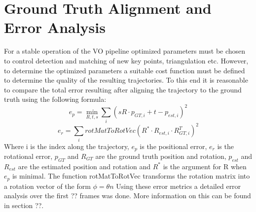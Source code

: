 \section{Ground Truth Alignment and Error Analysis}
\label{simulation}
For a stable operation of the VO pipeline optimized parameters must be chosen to control detection and matching of new key points, triangulation etc. However, to determine the optimized parameters a suitable cost function must be defined to determine the quality of the resulting trajectories. To this end it is reasonable to compare the total error resulting after aligning the trajectory to the ground truth using the following formula:
$$e_p = \underset{R,t,s}{\min} \sum_i (sR \cdot p_{GT, i} + t - p_{est, i})^2$$ 
$$e_r = \sum_i rotMatToRotVec(R^* \cdot R_{est,i} \cdot R_{GT, i}^T)^2$$
Where i is the index along the trajectory, $e_p$ is the positional error, $e_r$ is the rotational error, $p_{GT}$ and $R_{GT}$ are the ground truth position and rotation, $p_{est}$ and $R_{est}$ are the estimated position and rotation and $R^*$ is the argument for R when $e_p$ is minimal. The function rotMatToRotVec transforms the rotation matrix into a rotation vector of the form $\phi = \theta n$  Using these error metrics a detailed error analysis over the first ?? frames was done. More information on this can be found in section ??.
